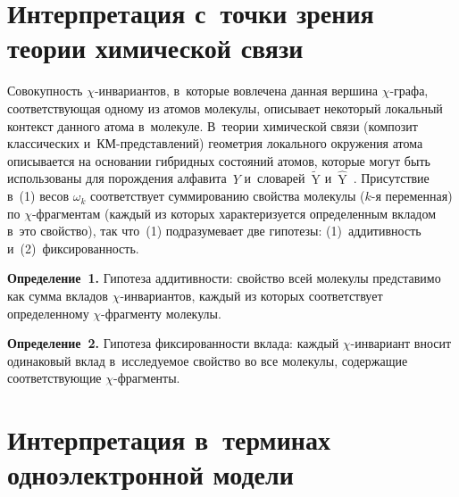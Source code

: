 \begin{multicols}{2}
\section{Интерпретация с~точки зрения теории химической 
связи}

    Совокупность $\chi$-инвариантов, в~которые вовлечена данная вершина 
$\chi$-гра\-фа, соответствующая одному из атомов молекулы, описывает 
некоторый локальный контекст данного атома в~молекуле. В~тео\-рии 
химической связи (композит классических и~КМ-пред\-став\-ле\-ний)  
гео\-мет\-рия локального окружения атома описывается на основании 
гибридных состояний атомов, которые могут быть использованы для 
порождения алфавита~$Y$ и~словарей~$\tilde{\mathrm{Y}}$ 
и~$\hat{\mathrm{Y}}$~\cite{3-tor}. Присутствие в~(1) весов $\omega_k$ 
соответствует суммированию свойства молекулы ($k$-я переменная) по  
$\chi$-фраг\-мен\-там (каждый из которых характеризуется определенным 
вкладом в~это свойство), так что~(1) подразумевает две гипотезы: 
(1)~аддитивность и~(2)~фиксированность.

\smallskip

\noindent
\textbf{Определение~1.} Гипотеза аддитивности: свойство всей молекулы 
представимо как сумма вкладов $\chi$-ин\-ва\-ри\-ан\-тов, каждый из которых 
соответствует определенному $\chi$-фраг\-мен\-ту молекулы.

\smallskip

\noindent
\textbf{Определение~2.} Гипотеза фиксированности вклада: каждый  
$\chi$-ин\-ва\-ри\-ант вносит одинаковый вклад в~исследуемое свойство во все 
молекулы, содержащие соответствующие $\chi$-фраг\-менты.


\section{Интерпретация в~терминах одноэлектронной 
модели}
    

\end{multicols}
